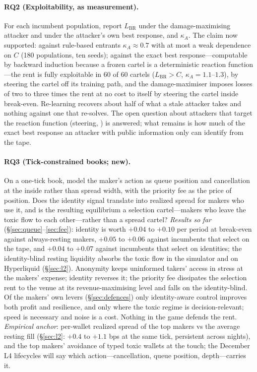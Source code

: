 \documentclass[11pt]{article}
\begin{document}
\paragraph{RQ2 (Exploitability, as measurement).} For each incumbent population, report $L_{\mathrm{BR}}$ under the damage-maximising attacker and under the attacker's own best response, and $\kappa_A$. The claim now supported: against rule-based entrants $\kappa_A\approx0.7$ with at most a weak dependence on $C$ (180 populations, ten seeds); against the exact best response---computable by backward induction because a frozen cartel is a deterministic reaction function---the rent is fully exploitable in 60 of 60 cartels ($L_{\mathrm{BR}}>C$, $\kappa_A=1.1$--$1.3$), by steering the cartel off its training path, and the damage-maximiser imposes losses of two to three times the rent at no cost to itself by steering the cartel inside break-even. Re-learning recovers about half of what a stale attacker takes and nothing against one that re-solves. The open question about attackers that target the reaction function (steering, \cite{dss,brownmackay}) is answered; what remains is how much of the exact best response an attacker with public information only can identify from the tape.

\paragraph{RQ3 (Tick-constrained books; new).} On a one-tick book, model the maker's action as queue position and cancellation at the inside rather than spread width, with the priority fee as the price of position. Does the identity signal translate into realized spread for makers who use it, and is the resulting equilibrium a selection cartel---makers who leave the toxic flow to each other---rather than a spread cartel? \emph{Results so far} (\S\ref{sec:queue}--\ref{sec:fee}): identity is worth $+0.04$ to $+0.10$ per period at break-even against always-resting makers, $+0.05$ to $+0.06$ against incumbents that select on the tape, and $+0.04$ to $+0.07$ against incumbents that select on identities; the identity-blind resting liquidity absorbs the toxic flow in the simulator and on Hyperliquid (\S\ref{sec:l2}). Anonymity keeps uninformed takers' access in stress at the makers' expense; identity reverses it; the priority fee dissipates the selection rent to the venue at its revenue-maximising level and falls on the identity-blind. Of the makers' own levers (\S\ref{sec:defences}) only identity-aware control improves both profit and resilience, and only where the toxic regime is decision-relevant; speed is necessary and noise is a cost. Nothing in the game defends the rent. \emph{Empirical anchor}: per-wallet realized spread of the top makers vs the average resting fill (\S\ref{sec:l2}: $+0.4$ to $+1.1$ bps at the same tick, persistent across nights), and the top makers' avoidance of typed toxic wallets at the touch; the December L4 lifecycles will say which action---cancellation, queue position, depth---carries it.
\end{document}

